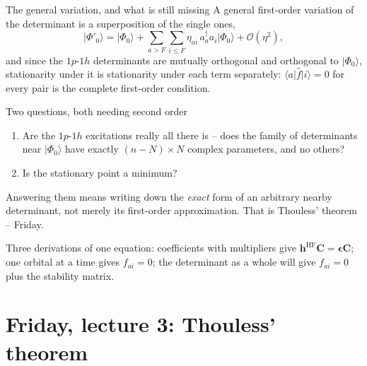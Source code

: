 \documentclass[aspectratio=169,10pt]{beamer}
\newcommand{\mbbox}[1]{%
  \begin{tcolorbox}[colback=paleblue,colframe=uioblue,title={\bfseries Many-body connection}]
  #1
  \end{tcolorbox}}
\newcommand{\ket}[1]{\vert #1\rangle}
\newcommand{\element}[3]{\langle #1\vert #2\vert #3\rangle}
\newcommand{\bigO}{\mathcal{O}}
\begin{document}
\begin{frame}{The general variation, and what is still missing}
  \footnotesize
  A general first-order variation of the determinant is a superposition of the single ones,
  \[
    \ket{\Phi'_0}=\ket{\Phi_0}+\sum_{a>F}\sum_{i\le F}\eta_{ai}\,a_a^{\dagger}a_i\ket{\Phi_0}+\bigO(\eta^2),
  \]
  and since the $1p$-$1h$ determinants are mutually orthogonal and orthogonal to $\ket{\Phi_0}$, stationarity under it is stationarity under each term separately: $\element{a}{\hat{f}}{i}=0$ for every pair is the \alert{complete} first-order condition.
  \begin{block}{Two questions, both needing second order}
    \begin{enumerate}
      \item Are the $1p$-$1h$ excitations really all there is -- does the family of determinants near $\ket{\Phi_0}$ have exactly $(n-N)\times N$ complex parameters, and no others?
      \item Is the stationary point a minimum?
    \end{enumerate}
  \end{block}
  Answering them means writing down the \emph{exact} form of an arbitrary nearby determinant, not merely its first-order approximation. That is Thouless' theorem -- Friday.
  \vspace{0.3em}
  \mbbox{Three derivations of one equation: coefficients with multipliers give $\bm{h}^{\mathrm{HF}}\bm{C}=\bm{\epsilon}\bm{C}$; one orbital at a time gives $f_{ai}=0$; the determinant as a whole will give $f_{ai}=0$ plus the stability matrix.}
\end{frame}

\section{Friday, lecture 3: Thouless' theorem}
\end{document}
